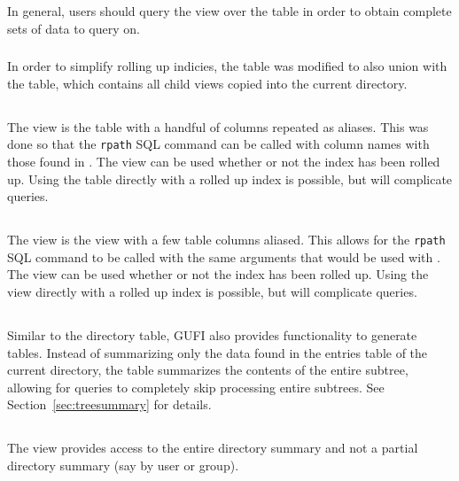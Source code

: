 In general, users should query the \pentries view over the \entries
table in order to obtain complete sets of data to query on.

\subsubsection{\pentriesrollup}
In order to simplify rolling up indicies, the \pentries table was
modified to also union with the \pentriesrollup table, which contains
all child \pentries views copied into the current directory.

\subsection{\vrsummary}
The \vrsummary view is the \summary table with a handful of columns
repeated as aliases. This was done so that the \texttt{rpath} SQL
command can be called with column names with those found in
\vrpentries. The \vrsummary view can be used whether or not the index
has been rolled up. Using the \summary table directly with a rolled up
index is possible, but will complicate queries.

\subsection{\vrpentries}
The \vrpentries view is the \pentries view with a few \summary table
columns aliased. This allows for the \texttt{rpath} SQL command to be
called with the same arguments that would be used with \vrsummary.
The \vrpentries view can be used whether or not the index has been
rolled up. Using the \pentries view directly with a rolled up index is
possible, but will complicate queries.

\subsection{\treesummary}
Similar to the directory \summary table, GUFI also provides
functionality to generate \treesummary tables. Instead of summarizing
only the data found in the entries table of the current directory, the
\treesummary table summarizes the contents of the entire subtree,
allowing for queries to completely skip processing entire
subtrees. See Section~\ref{sec:treesummary} for details.

\subsection{\vsummarydir}
The \vsummarydir view provides access to the entire directory summary
and not a partial directory summary (say by user or group).

